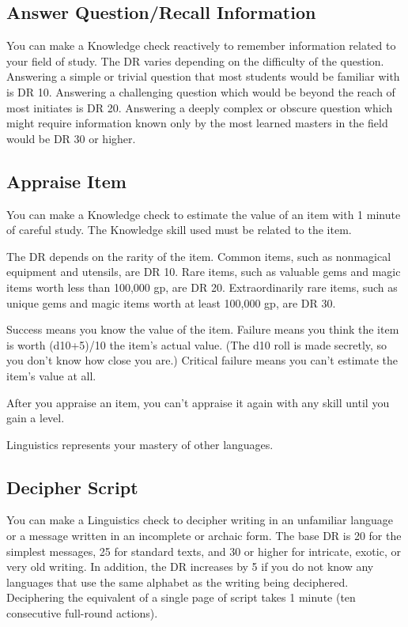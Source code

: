     \subsection{Answer Question/Recall Information}
        You can make a Knowledge check reactively to remember information related to your field of study. The DR varies depending on the difficulty of the question. Answering a simple or trivial question that most students would be familiar with is DR 10. Answering a challenging question which would be beyond the reach of most initiates is DR 20. Answering a deeply complex or obscure question which might require information known only by the most learned masters in the field would be DR 30 or higher.

    \subsection{Appraise Item}
        You can make a Knowledge check to estimate the value of an item with 1 minute of careful study. The Knowledge skill used must be related to the item.

        The DR depends on the rarity of the item. Common items, such as nonmagical equipment and utensils, are DR 10. Rare items, such as valuable gems and magic items worth less than 100,000 gp, are DR 20. Extraordinarily rare items, such as unique gems and magic items worth at least 100,000 gp, are DR 30.

        Success means you know the value of the item. Failure means you think the item is worth (d10+5)/10 \mtimes the item's actual value. (The d10 roll is made secretly, so you don't know how close you are.) Critical failure means you can't estimate the item's value at all.

        After you appraise an item, you can't appraise it again with any skill until you gain a level.

        Linguistics represents your mastery of other languages.

    \subsection{Decipher Script}
        You can make a Linguistics check to decipher writing in an unfamiliar language or a message written in an incomplete or archaic form. The base DR is 20 for the simplest messages, 25 for standard texts, and 30 or higher for intricate, exotic, or very old writing. In addition, the DR increases by 5 if you do not know any languages that use the same alphabet as the writing being deciphered. Deciphering the equivalent of a single page of script takes 1 minute (ten consecutive full-round actions).

